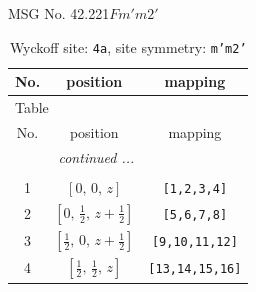 \documentclass[fleqn,8pt]{jsarticle}
\begin{document}
\setcounter{MaxMatrixCols}{32}

\renewcommand{\tablename}{Table~}
\renewcommand{\figurename}{Figure~}
\begin{center}
\LARGE
MSG No. 42.221\quad$Fm'm2'$
\end{center}
\renewcommand{\arraystretch}{1.2}
\begin{longtable}{ccc}
\caption{Wyckoff site: {\tt 4a}, site symmetry: {\tt m'm2'}}
 \\
 \hline \hline
No. & position & mapping \\ \hline \endfirsthead

\multicolumn{2}{l}{\tablename\ \thetable{}} \\
 \hline \hline
No. & position & mapping \\ \hline \endhead

 \hline \hline
\multicolumn{2}{r}{\footnotesize\it continued ...} \\ \endfoot

 \hline \hline
\multicolumn{2}{r}{} \\ \endlastfoot

1 & $\left[ 0,\, 0,\, z \right]$ & {\tt [1,2,3,4]} \\ \hline
2 & $\left[ 0,\, \frac{1}{2},\, z + \frac{1}{2} \right]$ & {\tt [5,6,7,8]} \\ \hline
3 & $\left[ \frac{1}{2},\, 0,\, z + \frac{1}{2} \right]$ & {\tt [9,10,11,12]} \\ \hline
4 & $\left[ \frac{1}{2},\, \frac{1}{2},\, z \right]$ & {\tt [13,14,15,16]} \\
\end{longtable}
\renewcommand{\arraystretch}{1.2}
\end{document}
